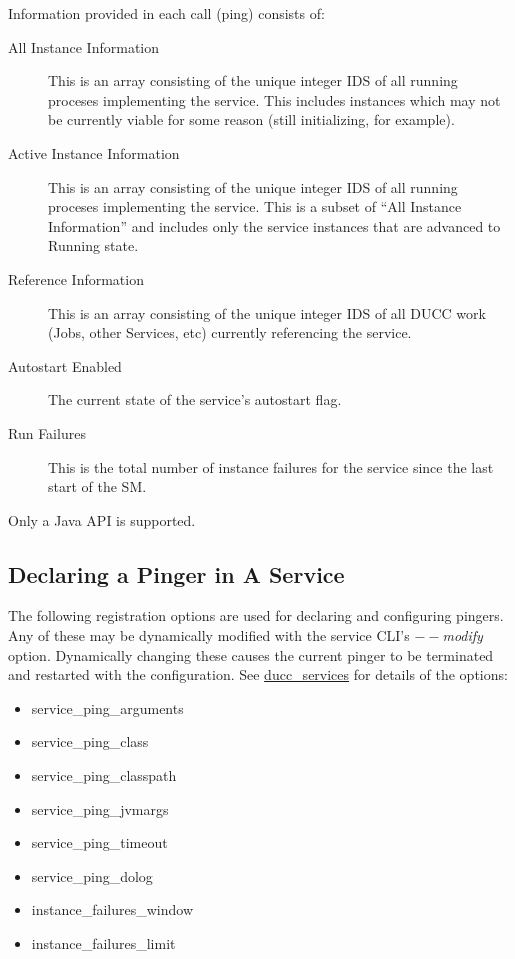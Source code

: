       Information provided in each call (ping) consists of:
      \begin{description}
        \item[All Instance Information] This is an array consisting of the unique integer
          IDS of all running proceses implementing the service.  This includes instances
          which may not be currently viable for some reason (still initializing, for example).

        \item[Active Instance Information] This is an array consisting of the unique integer
          IDS of all running proceses implementing the service.  This is a subset of 
          ``All Instance Information'' and includes only the service instances that are advanced
          to Running state.

        \item[Reference Information] This is an array consisting of the unique integer
          IDS of all DUCC work (Jobs, other Services, etc) currently referencing the
          service.  
          
        \item[Autostart Enabled] The current state of the service's autostart flag.
          
        \item[Run Failures] This is the total number of instance failures for the 
          service since the last start of the SM.
      \end{description}

      Only a Java API is supported.

      \subsection{Declaring a Pinger in A Service}

      The following registration options are used for declaring and configuring pingers.  Any of these
      may be dynamically modified with the service CLI's {\em$--$modify} option.  Dynamically changing
      these causes the current pinger to be terminated and restarted with the configuration.  See
      \hyperref[sec:cli.ducc-services]{ducc\_services} for details of the options:
      \begin{itemize}
        \item service\_ping\_arguments
        \item service\_ping\_class
        \item service\_ping\_classpath
        \item service\_ping\_jvmargs
        \item service\_ping\_timeout
        \item service\_ping\_dolog
        \item instance\_failures\_window
        \item instance\_failures\_limit
      \end{itemize}

